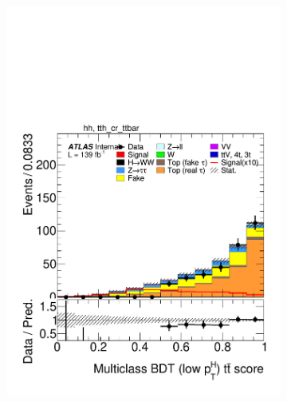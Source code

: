 \begin{figure}[h]
\begin{subfigure}[b]{0.32\textwidth}
    \includegraphics[width=\textwidth]{images/sr_cr_plots/plot_tth_ttbar_multiclass_lt200_hh_tth_cr_ttbar.pdf}
    \caption{}
  \end{subfigure}
  \begin{subfigure}[b]{0.32\textwidth}

\end{subfigure}
\end{figure}
